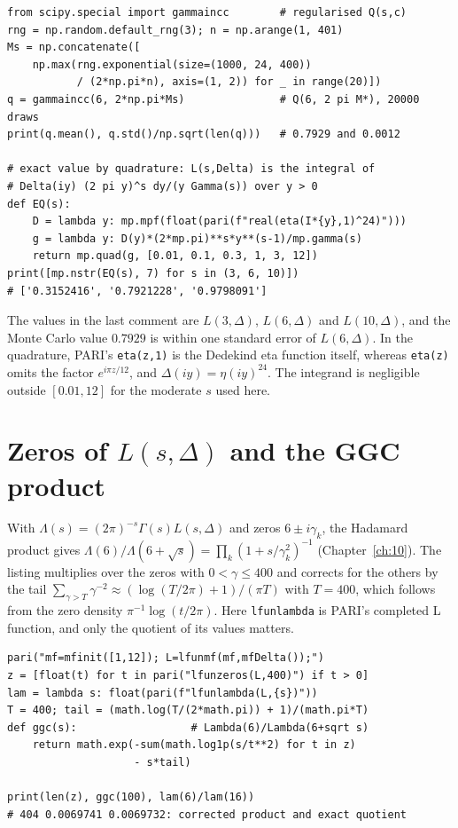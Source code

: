 {\footnotesize
\begin{verbatim}
from scipy.special import gammaincc        # regularised Q(s,c)
rng = np.random.default_rng(3); n = np.arange(1, 401)
Ms = np.concatenate([
    np.max(rng.exponential(size=(1000, 24, 400))
           / (2*np.pi*n), axis=(1, 2)) for _ in range(20)])
q = gammaincc(6, 2*np.pi*Ms)               # Q(6, 2 pi M*), 20000 draws
print(q.mean(), q.std()/np.sqrt(len(q)))   # 0.7929 and 0.0012

# exact value by quadrature: L(s,Delta) is the integral of
# Delta(iy) (2 pi y)^s dy/(y Gamma(s)) over y > 0
def EQ(s):
    D = lambda y: mp.mpf(float(pari(f"real(eta(I*{y},1)^24)")))
    g = lambda y: D(y)*(2*mp.pi)**s*y**(s-1)/mp.gamma(s)
    return mp.quad(g, [0.01, 0.1, 0.3, 1, 3, 12])
print([mp.nstr(EQ(s), 7) for s in (3, 6, 10)])
# ['0.3152416', '0.7921228', '0.9798091']
\end{verbatim}
}

The values in the last comment are $L(3,\Delta)$, $L(6,\Delta)$ and $L(10,\Delta)$, and the Monte Carlo value $0.7929$ is within one standard error of $L(6,\Delta)$. In the quadrature, PARI's \texttt{eta(z,1)} is the Dedekind eta function itself, whereas \texttt{eta(z)} omits the factor $e^{i\pi z/12}$, and $\Delta(iy)=\eta(iy)^{24}$. The integrand is negligible outside $[0.01,12]$ for the moderate $s$ used here.

\section{Zeros of $L(s,\Delta)$ and the GGC product}

With $\Lambda(s)=(2\pi)^{-s}\Gamma(s)L(s,\Delta)$ and zeros $6\pm i\gamma_k$, the Hadamard product gives $\Lambda(6)/\Lambda(6+\sqrt s)=\prod_k(1+s/\gamma_k^2)^{-1}$ (Chapter~\ref{ch:10}). The listing multiplies over the zeros with $0<\gamma\le400$ and corrects for the others by the tail $\sum_{\gamma>T}\gamma^{-2}\approx(\log(T/2\pi)+1)/(\pi T)$ with $T=400$, which follows from the zero density $\pi^{-1}\log(t/2\pi)$. Here \texttt{lfunlambda} is PARI's completed L function, and only the quotient of its values matters.

{\footnotesize
\begin{verbatim}
pari("mf=mfinit([1,12]); L=lfunmf(mf,mfDelta());")
z = [float(t) for t in pari("lfunzeros(L,400)") if t > 0]
lam = lambda s: float(pari(f"lfunlambda(L,{s})"))
T = 400; tail = (math.log(T/(2*math.pi)) + 1)/(math.pi*T)
def ggc(s):                  # Lambda(6)/Lambda(6+sqrt s)
    return math.exp(-sum(math.log1p(s/t**2) for t in z)
                    - s*tail)

print(len(z), ggc(100), lam(6)/lam(16))
# 404 0.0069741 0.0069732: corrected product and exact quotient
\end{verbatim}
}

